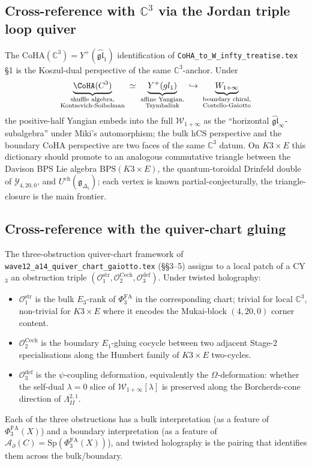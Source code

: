 \documentclass[11pt]{article}
\providecommand{\Eone}{E_1}
\providecommand{\Ethree}{E_3}
\providecommand{\C}{\mathbb{C}}
\providecommand{\cA}{\mathcal{A}}
\providecommand{\cW}{\mathcal{W}}
\providecommand{\cY}{\mathcal{Y}}
\providecommand{\fg}{\mathfrak{g}}
\providecommand{\fgl}{\mathfrak{gl}}
\providecommand{\hCS}{\mathrm{hCS}}
\providecommand{\Sp}{\mathrm{Sp}}
\begin{document}
\subsection{Cross-reference with $\C^3$ via the Jordan triple loop
  quiver}

The CoHA$(\C^3) = Y^+(\widehat{\fgl}_1)$ identification of
\texttt{CoHA\_to\_W\_infty\_treatise.tex} \S1 is the Koszul-dual
perspective of the same $\C^3$-anchor. Under
\[
  \underbrace{\CoHA(\C^3)}_{\substack{\text{shuffle algebra,}\\ \text{Kontsevich-Soibelman}}}
  \;\simeq\;
  \underbrace{Y^+(\widehat{\fgl}_1)}_{\substack{\text{affine Yangian,}\\ \text{Tsymbaliuk}}}
  \;\hookrightarrow\;
  \underbrace{\cW_{1+\infty}}_{\substack{\text{boundary chiral,}\\ \text{Costello-Gaiotto}}}
\]
the positive-half Yangian embeds into the full $\cW_{1+\infty}$ as the
``horizontal $\widehat{\fgl}_\infty$-subalgebra'' under Miki's
automorphism; the bulk $\hCS$ perspective and the boundary CoHA
perspective are two faces of the same $\C^3$ datum. On $K3\times E$
this dictionary should promote to an analogous commutative triangle
between the Davison BPS Lie algebra $\mathrm{BPS}(K3\times E)$, the
quantum-toroidal Drinfeld double of $\cY_{4,20,0}$, and
$U^{\mathrm{ch}}(\fg_{\Delta_5})$; each vertex is known
partial-conjecturally, the triangle-closure is the main frontier.

\subsection{Cross-reference with the quiver-chart gluing}

The three-obstruction quiver-chart framework of
\texttt{wave12\_a14\_quiver\_chart\_gaiotto.tex} (\S\S 3--5) assigns to
a local patch of a CY$_3$ an obstruction triple
$(\mathcal{O}_1^{\mathrm{str}}, \mathcal{O}_2^{\mathrm{Cech}},
\mathcal{O}_3^{\mathrm{def}})$. Under twisted holography:
\begin{itemize}[leftmargin=1.5em]
\item $\mathcal{O}_1^{\mathrm{str}}$ is the bulk $\Ethree$-rank of
$\Phi^{\mathrm{FA}}_3$ in the corresponding chart; trivial for local
$\C^3$, non-trivial for $K3\times E$ where it encodes the Mukai-block
$(4,20,0)$ corner content.
\item $\mathcal{O}_2^{\mathrm{Cech}}$ is the boundary $\Eone$-gluing
cocycle between two adjacent Stage-2 specialisations along the Humbert
family of $K3\times E$ two-cycles.
\item $\mathcal{O}_3^{\mathrm{def}}$ is the $\psi$-coupling deformation,
equivalently the $\Omega$-deformation: whether the self-dual
$\lambda = 0$ slice of $\cW_{1+\infty}[\lambda]$ is preserved along
the Borcherds-cone direction of $\Lambda^{2,1}_{II}$.
\end{itemize}
Each of the three obstructions has a bulk interpretation (as a feature
of $\Phi^{\mathrm{FA}}_3(X)$) and a boundary interpretation (as a
feature of $\cA_\partial(C) = \Sp(\Phi^{\mathrm{FA}}_3(X))$), and
twisted holography is the pairing that identifies them across the bulk/boundary.
\end{document}
